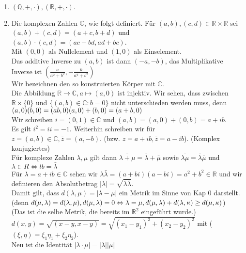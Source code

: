 \documentclass{report}
\newcommand{\lb}{\lambda}
\newcommand{\R}{\mathbb{R}}
\newcommand{\Q}{\mathbb{Q}}
\newcommand{\C}{\mathbb{C}}
\theoremstyle{customrem}
\theoremstyle{customdef}
\begin{document}
\begin{enumerate}
\item{$(\Q, +, \cdot), (\R, +, \cdot)$.}
\item{Die komplexen Zahlen $\C$, wie folgt definiert. Für $(a, b), (c, d) \in \R \times \R$ sei\\
$(a, b)+(c, d) = (a + c, b + d)$ und\\
$(a,b)\cdot (c,d) = (ac-bd, ad + bc)$.\\
Mit $(0, 0)$ als Nullelement und $(1, 0)$ als Einselement.\\
Das additive Inverse zu $(a, b)$ ist dann $(-a, -b)$, das Multiplikative Inverse ist $(\frac{a}{a^2+b^2}, -\frac{b}{a^2 + b^2})$\\
Wir bezeichnen den so konstruierten Körper mit $\C$.\\
Die Abbildung $\R \to \C, a \mapsto (a, 0)$ ist injektiv. Wir sehen, dass zwischen $\R \times \{0\}$ und $\{(a, b) \in \C : b = 0\}$ nicht unterschieden werden muss, denn \\
$
(a, 0) (b, 0) = (ab, 0)\\
(a, 0) + (b, 0) = (a+b, 0)
$\\
Wir schreiben $i = (0, 1) \in \C$ und $(a, b) = (a, 0) + (0, b) = a + ib$.\\
Es gilt $i^2 = ii = -1$. Weiterhin schreiben wir  für $z = (a, b) \in \C, \bar{z} = (a, -b)$. (bzw. $z = a + ib, \bar{z} = a - ib$). (Komplex konjugiertes)\\
Für komplexe Zahlen $\lb, \mu$ gilt dann $\overline{\lb + \mu} = \bar{\lb} + \bar{\mu}$ sowie $\overline{\lb \mu} = \bar{\lb}\bar{\mu}$ und $\lb \in R \Leftrightarrow lb = \bar{\lb}$\\
Für $\lb = a+ib \in \C$ sehen wir $\lb \bar{\lb} = (a + bi) (a - bi) = a^2 + b^2 \in \R$ und wir definieren den Absolutbetrag $|\lb| = \sqrt{\lb \bar{\lb}}$.\\
Damit gilt, dass $d(\lb, \mu) = |\lb - \mu|$ ein Metrik im Sinne von Kap 0 darstellt. (denn $d(\mu, \lb) = d(\lb, \mu),\\
d(\mu, \lb) = 0 \Leftrightarrow \lb = \mu,\\
d(\mu, \lb) + d(\lb, \kappa) \ge d(\mu, \kappa)$)\\
(Das ist die selbe Metrik, die bereits im $\R^2$ eingeführt wurde.)\\
$d(x, y) = \sqrt{(x - y, x - y)} = \sqrt{(x_1-y_1)^2 + (x_2 - y_2)^2}$ mit ($(\xi, \eta) = \xi_1 \eta_1 + \xi_2 \eta_2$).\\
Neu ist die Identität $|\lb \cdot \mu| = |\lb| |\mu|$\\
}
\end{enumerate}
\end{document}
